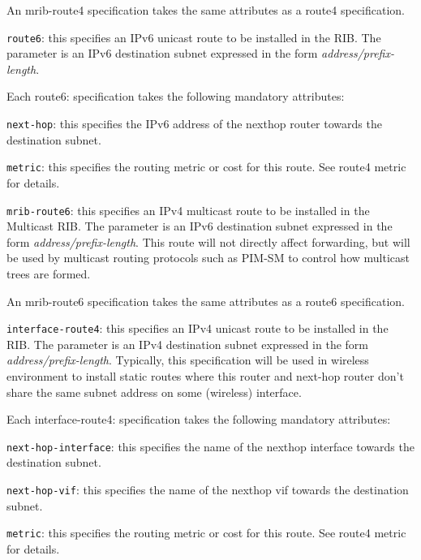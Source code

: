 \begin{description}
  An {\stt mrib-route4} specification takes the same attributes as a
  {\stt route4} specification.
\item{\tt route6}: this specifies an IPv6 unicast route to be
  installed in the RIB.  The parameter is an IPv6 destination subnet
  expressed in the form {\it address/prefix-length}.

  Each {\stt route6}: specification takes the following mandatory
  attributes:
\begin{description}
\item{\tt next-hop}: this specifies the IPv6 address of the nexthop
  router towards the destination subnet.
\item{\tt metric}: this specifies the routing metric or cost for this
  route.  See {\stt route4 metric} for details.
\end{description}
\item{\tt mrib-route6}: this specifies an IPv4 multicast route to be
  installed in the Multicast RIB.  The parameter is an IPv6
  destination subnet expressed in the form {\it
  address/prefix-length}.  This route will not directly affect
  forwarding, but will be used by multicast routing protocols such as
  PIM-SM to control how multicast trees are formed.

  An {\stt mrib-route6} specification takes the same attributes as a
  {\stt route6} specification.

\item{\tt interface-route4}: this specifies an IPv4 unicast route to be
  installed in the RIB.  The parameter is an IPv4 destination subnet
  expressed in the form {\it address/prefix-length}. Typically, this
  specification will be used in wireless environment to install
  static routes where this router and next-hop router don't share the same
  subnet address on some (wireless) interface.

  Each {\stt interface-route4}: specification takes the following mandatory
  attributes:
\begin{description}
\item{\tt next-hop-interface}: this specifies the name of the nexthop
  interface towards the destination subnet.
\item{\tt next-hop-vif}: this specifies the name of the nexthop
  vif towards the destination subnet.
\item{\tt metric}: this specifies the routing metric or cost for this
  route.  See {\stt route4 metric} for details.
\end{description}

\end{description}

